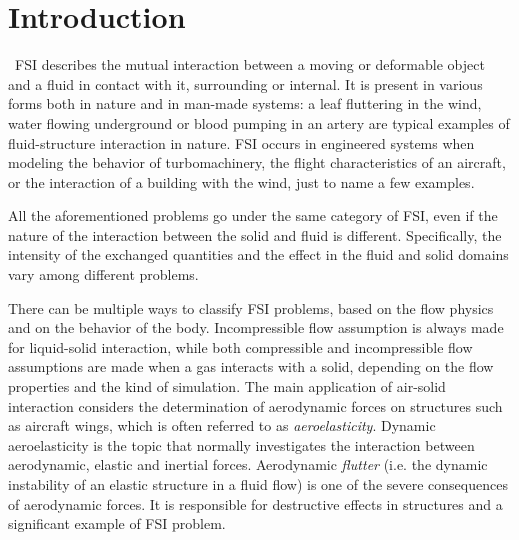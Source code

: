\chapter{Introduction}
\label{cha:intro}





~\ac{FSI} describes the mutual interaction between a moving or deformable object and a fluid in contact with it, surrounding or internal. It is present in various forms both in nature and in man-made systems: a leaf fluttering in the wind, water flowing underground or blood pumping in an artery are typical examples of fluid-structure interaction in nature. FSI occurs in engineered systems when modeling the behavior of turbomachinery, the flight characteristics of an aircraft, or the interaction of a building with the wind, just to name a few examples.

All the aforementioned problems go under the same  category of FSI, even if the nature of the interaction between the solid and fluid is different. Specifically, the intensity of the exchanged quantities and the effect in the fluid and solid domains vary among different problems.

There can be multiple ways to classify FSI problems, based on the flow physics and on the behavior of the body. Incompressible flow assumption is always made for liquid-solid interaction, while both compressible and incompressible flow assumptions are made when a gas interacts with a solid, depending on the flow properties and the kind of simulation. The main application of air-solid interaction considers the determination of aerodynamic forces on structures such as aircraft wings, which is often referred to as \textit{aeroelasticity}. Dynamic aeroelasticity is the topic that normally investigates the interaction between aerodynamic, elastic and inertial forces. Aerodynamic \textit{flutter} (i.e. the dynamic instability of an elastic structure in a fluid flow) is one of the severe consequences of aerodynamic forces. It is responsible for destructive effects in structures and a significant example of FSI problem.

